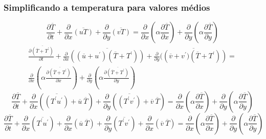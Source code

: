 \documentclass[xcolor=dvipsnames,10pt,aspectratio=169]{beamer}
\begin{document}
		
		\begin{frame}
		\frametitle{Simplificando a temperatura para valores médios}
		\begin{equation}
		\frac{\partial \overline{T}}{\partial t} + {\frac{\partial{}}{\partial{x}} \overline{(u T)}} + 
		{\frac{\partial{}}{\partial{y}} \overline{(v T)}} 
		=
		{\frac{\partial{}}{\partial{x}}} \left(\alpha {\frac{\partial{\overline{T}}}{\partial{x}}} \right) +
		{\frac{\partial{}}{\partial{y}}} \left(\alpha {\frac{\partial{\overline{T}}}{\partial{y}}} \right) 
		\end{equation}
		\begin{equation}
		\begin{split}
		\frac{\partial \overline{(\overline{T} + T^\prime)}}{\partial t} +{\frac{\partial{}}{\partial{x}} \overline{\left((\overline{u} + u^\prime)  (\overline{T} + T^\prime) \right)}} + 
		{\frac{\partial{}}{\partial{y}} \overline{(\left(\overline{v} + v^\prime)  (\overline{T} + T^\prime) \right)}} 
		= \\
		{\frac{\partial{}}{\partial{x}}} \left(\alpha {\frac{\partial{\overline{(\overline{T} + T^\prime)}}}{\partial{x}}} \right) +
		{\frac{\partial{}}{\partial{y}}} \left(\alpha {\frac{\partial{\overline{(\overline{T} + T^\prime)}}}{\partial{y}}} \right) 
		\end{split}
		\end{equation}
		\begin{equation}
		\frac{\partial \overline{T}}{\partial t} +\frac{\partial{}}{\partial{x}} \left(\overline{\left({T^\prime u^\prime}\right)} + \overline{u} \ \overline{T}\right)     + 
		\frac{\partial{}}{\partial{y}} \left(\overline{\left({T^\prime v^\prime}\right)} + \overline{v} \ \overline{T}\right) 
		=
		{\frac{\partial{}}{\partial{x}}} \left(\alpha {\frac{\partial{\overline{T}}}{\partial{x}}} \right) +
		{\frac{\partial{}}{\partial{y}}} \left(\alpha {\frac{\partial{\overline{T}}}{\partial{y}}} \right) 
		\end{equation}
		\begin{equation}\label{equation_preparede}
		\frac{\partial \overline{T}}{\partial t} +\frac{\partial{}}{\partial{x}} \left(\overline{T^\prime  u^\prime}\right) + \frac{\partial{}}{\partial{x}}\left(\overline{u} \ \overline{T}\right)     + 
		\frac{\partial{}}{\partial{y}} \left(\overline{T^\prime v^\prime}\right) + \frac{\partial{}}{\partial{x}}\left(\overline{v} \ \overline{T}\right) 
		=
		{\frac{\partial{}}{\partial{x}}} \left(\alpha {\frac{\partial{\overline{T}}}{\partial{x}}} \right) +
		{\frac{\partial{}}{\partial{y}}} \left(\alpha {\frac{\partial{\overline{T}}}{\partial{y}}} \right) 
		\end{equation}
		\end{frame}
		
\end{document}
